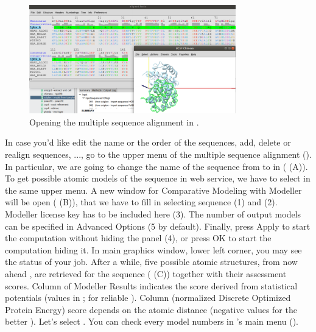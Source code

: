 \begin{itemize}
 \begin{figure}[H]
  \centering 
  \captionsetup{width=.7\linewidth} 
  \includegraphics[width=0.80\textwidth]{Images/Fig14}
  \caption{Opening the multiple sequence alignment in \chimera.}
  \label{fig:chimera_alignment}
  \end{figure}
\end{itemize}

In case you'd like edit the name or the order of the sequences, add,  delete or realign sequences, ..., go to the upper menu of the multiple sequence alignment (). In particular, we are going to change the name of the  sequence from  to  in  ( (A)). To get possible atomic models of the  sequence in \modeller web service, we have to select  in the same upper menu. A new window for Comparative Modeling with Modeller will be open ( (B)), that we have to fill in selecting  sequence (1) and  (2). Modeller license key has to be included here (3). The number of output models can be specified in Advanced Options (5 by default). Finally, press Apply to start the computation without hiding the panel (4), or press OK to start the computation hiding it. In \chimera main graphics window, lower left corner, you may see the status of your job. After a while, five possible atomic structures, from now ahead , are retrieved for the  sequence ( (C)) together with their assessment scores. Column  of Modeller Results indicates the score derived from statistical potentials (values in \ttt{[0,1]};  for reliable ). Column  (normalized Discrete Optimized Protein Energy) score depends on the atomic distance (negative values for the better ). Let's select  . You can check every model numbers in \chimera's main menu ().
 
